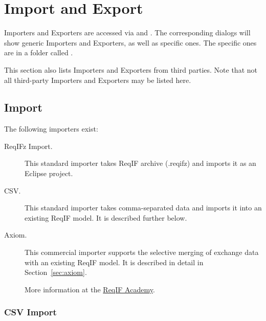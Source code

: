 \section{Import and Export}

Importers and Exporters are accessed via  and .  The corresponding dialogs will show generic Importers and Exporters, as well as specific ones.  The specific ones are in a folder called .

This section also lists Importers and Exporters from third parties. Note that not all third-party Importers and Exporters may be listed here.

\subsection{Import}

The following importers exist:

\begin{description}
\item[ReqIFz Import.] This standard importer takes ReqIF archive (.reqifz) and imports it as an Eclipse project.

\item[CSV.] This standard importer takes comma-separated data and imports it into an existing ReqIF model.  It is described further below.

\item[Axiom.] This commercial importer supports the selective merging of exchange data with an existing ReqIF model.  It is described in detail in Section~\ref{sec:axiom}.

More information at the \href{https://reqif.academy}{ReqIF Academy}.

\end{description}

\subsubsection{CSV Import}

